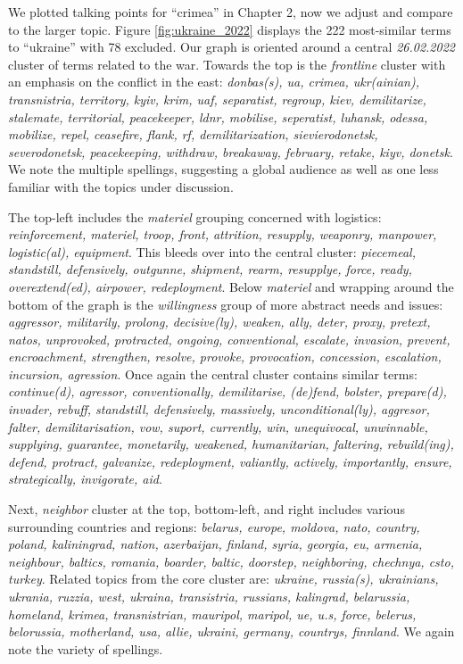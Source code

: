 \documentclass[doublespacing]{utdthesis}
\begin{document}
We plotted talking points for ``crimea'' in Chapter 2, now we adjust and compare to the larger topic.
Figure \ref{fig:ukraine_2022} displays the 222 most-similar terms to ``ukraine'' with 78 excluded.
Our graph is oriented around a central \emph{26.02.2022} cluster of terms related to the war.
Towards the top is the \emph{frontline} cluster with an emphasis on the conflict in the east: \emph{donbas(s), ua, crimea, ukr(ainian), transnistria, territory, kyiv, krim, uaf, separatist, regroup, kiev, demilitarize, stalemate, territorial, peacekeeper, ldnr, mobilise, seperatist, luhansk, odessa, mobilize, repel, ceasefire, flank, rf, demilitarization, sievierodonetsk, severodonetsk, peacekeeping, withdraw, breakaway, february, retake, kiyv, donetsk}.
We note the multiple spellings, suggesting a global audience as well as one less familiar with the topics under discussion.

The top-left includes the \emph{materiel} grouping concerned with logistics: \emph{reinforcement, materiel, troop, front, attrition, resupply, weaponry, manpower, logistic(al), equipment}.
This bleeds over into the central cluster: \emph{piecemeal, standstill, defensively, outgunne, shipment, rearm, resupplye, force, ready, overextend(ed), airpower, redeployment}.
Below \emph{materiel} and wrapping around the bottom of the graph is the \emph{willingness} group of more abstract needs and issues: \emph{aggressor, militarily, prolong, decisive(ly), weaken, ally, deter, proxy, pretext, natos, unprovoked, protracted, ongoing, conventional, escalate, invasion, prevent, encroachment, strengthen, resolve, provoke, provocation, concession, escalation, incursion, agression}.
Once again the central cluster contains similar terms: \emph{continue(d), agressor, conventionally, demilitarise, (de)fend, bolster, prepare(d), invader, rebuff, standstill, defensively, massively, unconditional(ly), aggresor, falter, demilitarisation, vow, suport, currently, win, unequivocal, unwinnable, supplying, guarantee, monetarily, weakened, humanitarian, faltering, rebuild(ing), defend, protract, galvanize, redeployment, valiantly, actively, importantly, ensure, strategically, invigorate, aid}.

Next, \emph{neighbor} cluster at the top, bottom-left, and right includes various surrounding countries and regions: \emph{belarus, europe, moldova, nato, country, poland, kaliningrad, nation, azerbaijan, finland, syria, georgia, eu, armenia, neighbour, baltics, romania, boarder, baltic, doorstep, neighboring, chechnya, csto, turkey}.
Related topics from the core cluster are: \emph{ukraine, russia(s), ukrainians, ukrania, ruzzia, west, ukraina, transistria, russians, kalingrad, belarussia, homeland, krimea, transnistrian, mauripol, maripol, ue, u.s, force, belerus, belorussia, motherland, usa, allie, ukraini, germany, countrys, finnland}.
We again note the variety of spellings.
\end{document}
